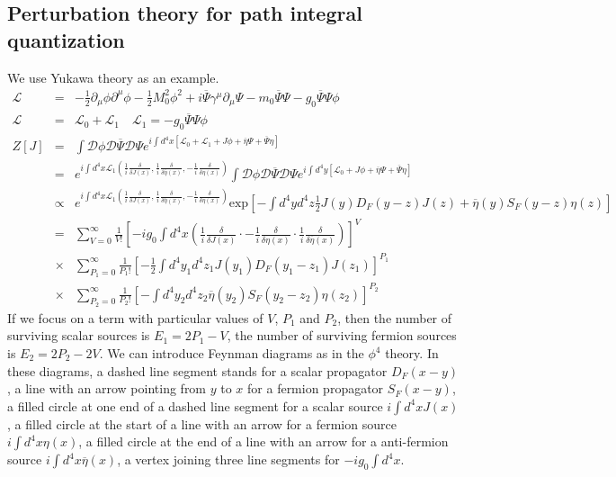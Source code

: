 \subsection{Perturbation theory for path integral quantization}
\noindent
We use Yukawa theory as an example.
\begin{eqnarray}
\mathcal{L} &=& -\frac{1}{2}\partial_{\mu} \phi \partial^{\mu} \phi -\frac{1}{2}M_0^2 \phi^2 + i\overline{\Psi} \gamma^{\mu} \partial_{\mu} \Psi - m_0\overline{\Psi}\Psi -g_0 \overline{\Psi}\Psi\phi \nonumber \\
\mathcal{L} &=& \mathcal{L}_0 + \mathcal{L}_1 \quad \mathcal{L}_1 =- g_0\overline{\Psi}\Psi\phi \nonumber \\
Z[J] &=& \int \mathcal{D}\phi \mathcal{D}\overline{\Psi} \mathcal{D}\Psi e^{i\int d^4x [\mathcal{L}_0 + \mathcal{L}_1 + J\phi + \overline{\eta}\Psi +  \overline{\Psi}\eta]} \nonumber \\
&=& e^{i\int d^4x \mathcal{L}_1(\frac{1}{i} \frac{\delta}{\delta J(x)},\frac{1}{i}\frac{\delta}{\delta \overline{\eta}(x)},-\frac{1}{i}\frac{\delta}{\delta \eta(x)})} \int \mathcal{D}\phi \mathcal{D}\overline{\Psi} \mathcal{D}\Psi e^{i\int d^4y [\mathcal{L}_0 + J\phi + \overline{\eta}\Psi +  \overline{\Psi}\eta]} \nonumber \\
&\propto & e^{i\int d^4x \mathcal{L}_1(\frac{1}{i} \frac{\delta}{\delta J(x)},\frac{1}{i}\frac{\delta}{\delta \overline{\eta}(x)},-\frac{1}{i}\frac{\delta}{\delta \eta(x)})} \mathrm{exp} [- \int d^4y d^4z  \frac{1}{2} J(y)D_F(y-z)J(z) + \overline{\eta}(y)S_F(y-z)\eta(z)] \nonumber \\
& =& \sum_{V=0}^{\infty} \frac{1}{V!} [-ig_0 \int d^4x (\frac{1}{i} \frac{\delta}{\delta J(x)}  \cdot -\frac{1}{i}\frac{\delta}{\delta \eta(x)} \cdot \frac{1}{i}\frac{\delta}{\delta \overline{\eta}(x)})]^V \nonumber \\
&\times & \sum_{P_1=0}^{\infty} \frac{1}{P_1!} [-\frac{1}{2} \int d^4y_1 d^4z_1 J(y_1)D_F(y_1-z_1)J(z_1)]^{P_1} \nonumber \\
&\times &  \sum_{P_2=0}^{\infty} \frac{1}{P_2!} [-\int d^4y_2 d^4z_2 \overline{\eta}(y_2)S_F(y_2-z_2)\eta(z_2)]^{P_2} \nonumber
\end{eqnarray}
If we focus on a term with particular values of $V$, $P_1$ and $P_2$, then the number of surviving scalar sources is $E_1 = 2P_1-V$, the number of surviving fermion sources is $E_2 = 2P_2-2V$.
We can introduce Feynman diagrams as in the $\phi^4$ theory. In these diagrams, a dashed line segment stands for a scalar propagator $D_F(x-y)$, a line with an arrow pointing from $y$ to $x$ for a fermion propagator $S_F(x-y)$, a filled circle at one end of a dashed line segment for a scalar source $i\int d^4x J(x)$, a filled circle at the start of a line with an arrow for a fermion source $i\int d^4x \eta(x)$, a filled circle at the end of a line with an arrow for a anti-fermion source $i\int d^4x \overline{\eta}(x)$, a vertex joining three line segments for $-ig_0\int d^4x$.

